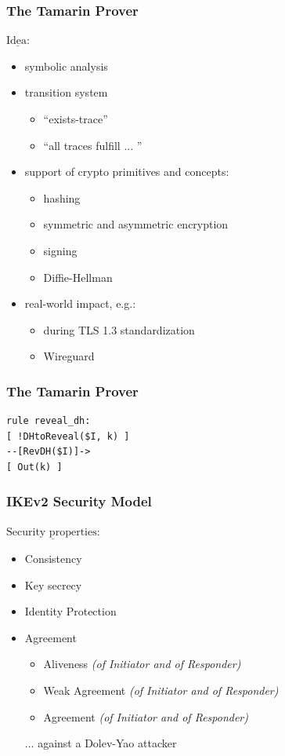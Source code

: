 \documentclass{beamer}
\begin{document}
\begin{frame}
\frametitle{The Tamarin Prover}
$\underline{\text{Idea:}}$  
\begin{itemize}
	\item symbolic analysis
	\pause
	\item transition system
	\begin{itemize}
		\item ``exists-trace'' 
		\item ``all traces fulfill ... '' 
	\end{itemize}
	\pause
	\item support of crypto primitives and concepts:
	\begin{itemize}
		\item hashing
		\item symmetric and asymmetric encryption
		\item signing
		\item Diffie-Hellman
	\end{itemize}
	\pause
	\item real-world impact, e.g.:
	\begin{itemize}
		\item during TLS 1.3 standardization
		\item Wireguard
	\end{itemize}
\end{itemize}
\end{frame}

\begin{frame}[fragile]
\frametitle{The Tamarin Prover}
\begin{lstlisting}[language=Tamarin]
rule reveal_dh:
[ !DHtoReveal($I, k) ] 
--[RevDH($I)]->       
[ Out(k) ]   
\end{lstlisting}
\end{frame}

\begin{frame}
\frametitle{IKEv2 Security Model}

$\underline{\text{Security properties:}}$              
\begin{itemize}	
	\item Consistency
	\pause
	\item Key secrecy
	\pause
	\item Identity Protection
	\pause
	\item Agreement \smallskip
	\pause
	\begin{itemize}
		\item Aliveness \textit{(of Initiator and of Responder)} 
		\pause        
		\item Weak Agreement \textit{(of Initiator and of Responder)}
		\pause
		\item Agreement \textit{(of Initiator and of Responder)}		
	\end{itemize}
\bigskip
\pause
$\dots$ against a Dolev-Yao attacker

	
\end{itemize}
\end{frame}
\end{document}
